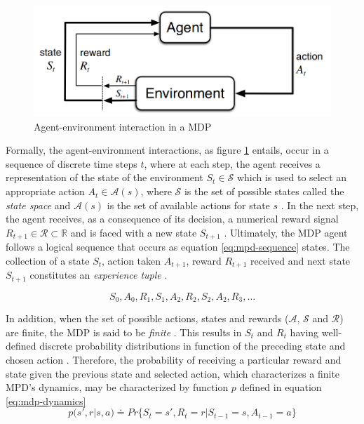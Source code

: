 \begin{figure}[ht]
	\centering
	\includegraphics[width=0.75\linewidth]{./figures/mpd.png}
	\caption{Agent-environment interaction in a \acs{MDP}  \cite{suttonReinforcementLearningIntroduction2014}}
	\label{fig:mpd-interaction}
\end{figure}

Formally, the agent-environment interactions, as figure \ref{fig:mpd-interaction} entails, occur in a sequence of discrete time steps $t$, where at each step, the agent receives a representation of the state of the environment $S_t \in \mathcal{S}$ which is used to select an appropriate action $A_t \in \mathcal{A}(s)$, where $\mathcal{S}$ is the set of possible states called the \textit{state space} and $\mathcal{A}(s)$ is the set of available actions for state $s$ \cite{suttonReinforcementLearningIntroduction2014, moralesGrokkingDeepReinforcement2020}. In the next step, the agent receives, as a consequence of its decision, a numerical reward signal $R_{t+1} \in \mathcal{R} \subset \mathbb{R}$ and is faced with a new state $S_{t +1}$ \cite{suttonReinforcementLearningIntroduction2014}. Ultimately, the MDP agent follows a logical sequence that occurs as equation \ref{eq:mpd-sequence} states. The collection of a state $S_t$, action taken $A_{t+1}$, reward $R_{t+1}$ received and next state $S_{t+1}$ constitutes an \textit{experience tuple} \cite{moralesGrokkingDeepReinforcement2020}.

\begin{equation} \label{eq:mpd-sequence}
	S_0, A_0, R_1, S_1, A_2, R_2, S_2, A_2, R_3, \dots
\end{equation}

In addition, when the set of possible actions, states and rewards ($\mathcal{A}$, $\mathcal{S}$ and $\mathcal{R}$) are finite, the \ac{MDP} is said to be \textit{finite} \cite{suttonReinforcementLearningIntroduction2014}. This results in $S_t$ and $R_t$ having well-defined discrete probability distributions in function of the preceding state and chosen action \cite{suttonReinforcementLearningIntroduction2014}. Therefore, the probability of receiving a particular reward and state given the previous state and selected action, which characterizes a finite MPD's dynamics, may be characterized by function $p$ defined in equation \ref{eq:mdp-dynamics}
\begin{equation} \label{eq:mdp-dynamics}
	p(s',r|s,a) \doteq Pr\{S_t = s', R_t = r | S_{t-1} = s, A_{t-1} = a\}
\end{equation}


